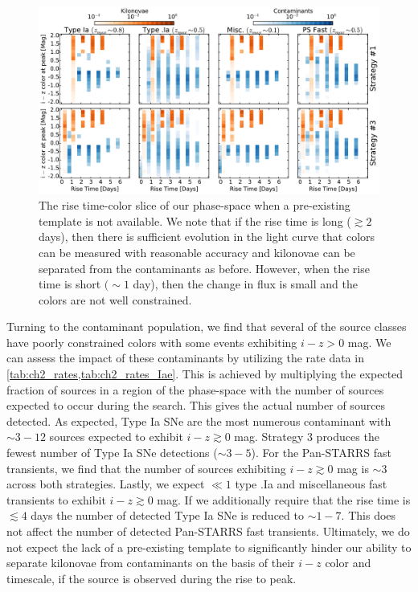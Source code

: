 \begin{figure}[t!]
\centering
\includegraphics[width=\textwidth]{./figs/chapter2/f14.pdf}
\caption{\singlespace The rise time-color slice of our phase-space when a pre-existing template is not available. We note that if the rise time is long ($\gtrsim2$ days), then there is sufficient evolution in the light curve that colors can be measured with reasonable accuracy and kilonovae can be separated from the contaminants as before. However, when the rise time is short $(\sim 1$ day), then the change in flux is small and the colors are not well constrained.}
\label{fig:ch2_phaserisediff}
\end{figure}

Turning to the contaminant population, we find that several of the source classes have poorly constrained colors with some events exhibiting $i-z > 0$ mag. We can assess the impact of these contaminants by utilizing the rate data in \cref{tab:ch2_rates,tab:ch2_rates_Iae}. This is achieved by multiplying the expected fraction of sources in a region of the phase-space with the number of sources expected to occur during the search. This gives the actual number of sources detected. As expected, Type Ia SNe are the most numerous contaminant with $\sim3-12$ sources expected to exhibit $i-z\gtrsim0$ mag. Strategy 3 produces the fewest number of Type Ia SNe detections ($\sim 3-5$). For the Pan-STARRS fast transients, we find that the number of sources exhibiting $i-z\gtrsim0$ mag is $\sim3$ across both strategies. Lastly, we expect $\ll1$ type .Ia and miscellaneous fast transients to exhibit $i-z\gtrsim0$ mag. If we additionally require that the rise time is $\lesssim 4$ days the number of detected Type Ia SNe is reduced to $\sim1-7$. This does not affect the number of detected Pan-STARRS fast transients. Ultimately, we do not expect the lack of a pre-existing template to significantly hinder our ability to separate kilonovae from contaminants on the basis of their $i-z$ color and timescale, if the source is observed during the rise to peak. 

